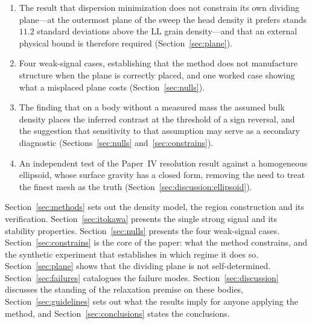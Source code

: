 \begin{enumerate}
\item The result that dispersion minimization does not constrain its own
dividing plane---at the outermost plane of the sweep the head density it
prefers stands $11.2$ standard deviations above the LL grain density---and
that an external physical bound is therefore required
(Section~\ref{sec:plane}).

\item Four weak-signal cases, establishing that the method does not
manufacture structure when the plane is correctly placed, and one worked
case showing what a misplaced plane costs (Section~\ref{sec:nulls}).

\item The finding that on a body without a measured mass the assumed
bulk density places the inferred contrast at the threshold of a sign
reversal, and the suggestion that sensitivity to that assumption may
serve as a secondary diagnostic (Sections~\ref{sec:nulls}
and~\ref{sec:constrains}).

\item An independent test of the Paper~IV resolution result against a
homogeneous ellipsoid, whose surface gravity has a closed form, removing
the need to treat the finest mesh as the truth
(Section~\ref{sec:discussion:ellipsoid}).
\end{enumerate}

Section~\ref{sec:methods} sets out the density model, the region
construction and its verification. Section~\ref{sec:itokawa} presents
the single strong signal and its stability properties.
Section~\ref{sec:nulls} presents the four weak-signal cases.
Section~\ref{sec:constrains} is the core of the paper: what the method
constrains, and the synthetic experiment that establishes in which
regime it does so. Section~\ref{sec:plane} shows that the dividing plane
is not self-determined. Section~\ref{sec:failures} catalogues the
failure modes. Section~\ref{sec:discussion} discusses the standing of
the relaxation premise on these bodies, Section~\ref{sec:guidelines}
sets out what the results imply for anyone applying the method, and
Section~\ref{sec:conclusions} states the conclusions.

%

